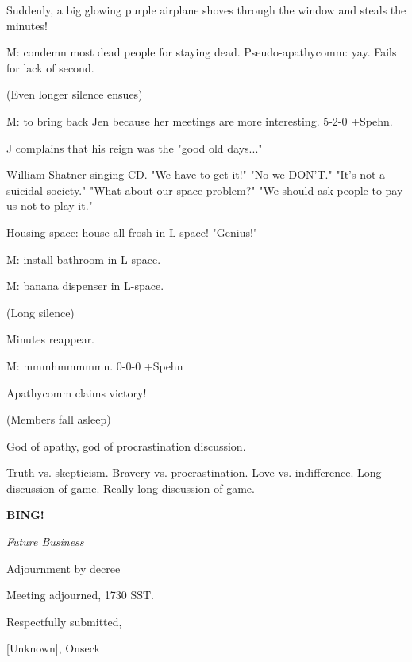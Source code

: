 \documentclass[12pt]{article}
\newcommand{\bing}{{\bf BING!} }
\newcommand{\goto}[1]{\bing \vskip 12pt \centerline{{\em{#1}}}}
\begin{document}
Suddenly, a big glowing purple airplane shoves through the window and steals the minutes!

M: condemn most dead people for staying dead. Pseudo-apathycomm: yay. Fails for lack of second.

(Even longer silence ensues)

M: to bring back Jen because her meetings are more interesting. 5-2-0 +Spehn.

J complains that his reign was the "good old days..."

William Shatner singing CD. "We have to get it!" "No we DON'T." "It's not a suicidal society." "What about our space problem?" "We should ask people to pay us not to play it."

Housing space: house all frosh in L-space! "Genius!"

M: install bathroom in L-space.

M: banana dispenser in L-space.

(Long silence)

Minutes reappear.

M: mmmhmmmmmn. 0-0-0 +Spehn

Apathycomm claims victory!

(Members fall asleep)

God of apathy, god of procrastination discussion.

Truth vs. skepticism. Bravery vs. procrastination. Love vs. indifference. Long discussion of game. Really long discussion of game.

\goto{Future Business}

Adjournment by decree

\vspace{12pt}

\noindent
Meeting adjourned, 1730 SST.

\vspace{18pt}

\centerline{Respectfully submitted,}
\centerline{[Unknown], Onseck}
\end{document}
